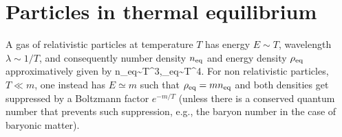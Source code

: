 \section{Particles in thermal equilibrium}
\label{sec:app:particles:thermal}

A gas of relativistic particles at temperature $T$ has energy $E\sim T$,
wavelength $\lambda \sim 1/T$, and consequently number density $n_{\rm eq}$ and
energy density $\rho_{\rm eq}$ approximatively given by
\beq  n_{\rm eq}\sim T^3,\qquad \rho_{\rm eq}\sim T^4.\eeq
For non relativistic particles, $T\ll m$, one instead has $E\simeq m$ 
such that $\rho_{\rm eq} = m n_{\rm eq}$ and
both densities get suppressed by a Boltzmann factor $e^{-m/T}$
(unless there is a conserved quantum number that prevents such suppression, e.g., the baryon number
in the case of baryonic matter).

\smallskip

